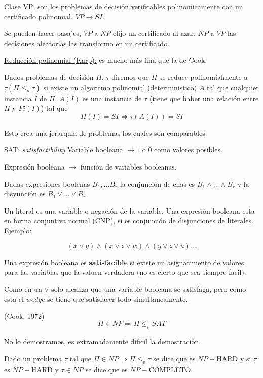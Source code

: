 \documentclass[12pt,a4paper]{article}
\begin{document}
\underline{Clase VP:} son los problemas de decisión verificables polinomicamente 
con un certificado polinomial. $VP \to SI$.
\medskip

Se pueden hacer pasajes, $VP$ a $NP$ elijo un certificado al azar. $NP$ a $VP$ 
las decisiones aleatorias las transformo en un certificado.
\medskip

\underline{Reducción polinomial (Karp):} es mucho más fina que la de Cook.
\medskip

Dados problemas de decisión $\Pi$, $\tau$ diremos que $\Pi$ se reduce polinomialmente 
a $\tau (\Pi \leq_{p} \tau)$ si existe un algoritmo polinomial (deterministico) 
$A$ tal que cualquier instancia $I$ de $\Pi$, $A(I)$ es una instancia de $\tau$ 
(tiene que haber una relación entre $\Pi$ y $Pi(I)$) tal que 
$$\Pi(I) = SI \Leftrightarrow \tau(A(I)) = SI$$

Esto crea una jerarquia de problemas los cuales son comparables.
\medskip

\underline{SAT: \textit{satisfactibility}}
\medskip
Variable booleana $\to 1$ o $0$ como valores posibles.

Expresión booleana $\to$ función de variables booleanas.
\medskip

Dadas expresiones boolenas $B_{1},\ldots B_{r}$ la conjunción de ellas es 
$B_{1} \wedge \ldots \wedge B_{r}$ y la disyunción es $B_{1} \vee \ldots \vee B_{r}$.
\medskip

Un literal es una variable o negación de la variable. Una expresión booleana esta 
en forma conjuntiva normal (CNP), si es conjunción de disjunciones de literales. 
Ejemplo:

$$(x \vee y) \wedge (\bar{x} \vee z \vee w) \wedge (y \vee \bar{z} \vee u)\ldots$$

Una expresión booleana es \textbf{satisfacible} si existe un asignacmiento de valores 
para las variablas que la valuen verdadera (no es cierto que sea siempre fácil).
\medskip

Como en un $\vee$ solo alcanza que una variable booleana se satisfaga, pero como 
esta el $wedge$ se tiene que satisfacer todo simultaneamente.
\medskip

\begin{teorema} (Cook, 1972)
    $$\Pi \in NP \Rightarrow \Pi \leq_{p} SAT$$ 
\end{teorema}

No lo demostramos, es extramadamente dificil la demostración.
\medskip

Dado un problema $\tau$ tal que $\Pi \in NP \Rightarrow \Pi \leq_{p} \tau$ se dice 
que es $NP-$HARD y si $\tau$ es $NP-$HARD y $\tau \in NP$ se dice que es $NP-$COMPLETO.
\medskip
\end{document}
